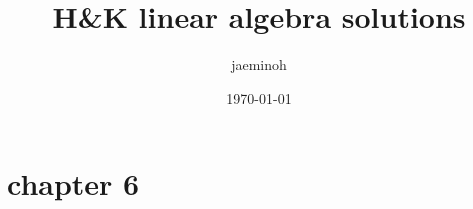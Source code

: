 \documentclass{amsart}
\author{jaeminoh}
\date{\today}
\title{H\&K linear algebra solutions}
\begin{document}
\maketitle

\section*{chapter 6}



\end{document}
